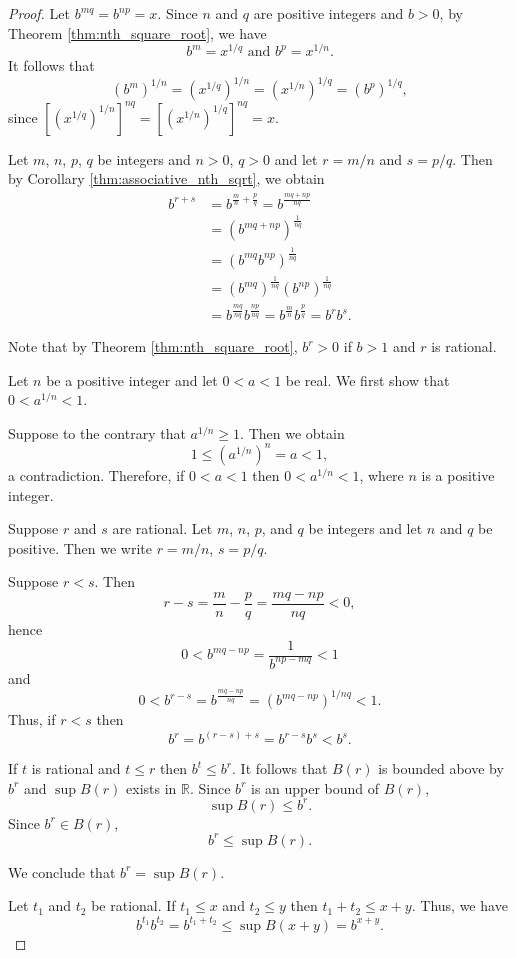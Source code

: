 \documentclass[11pt]{article}
\theoremstyle{definition}
\theoremstyle{plain}
\theoremstyle{remark}
\newcommand{\R}{\mathbb{R}}
\begin{document}
\begin{proof}
\item[(a)]
Let $b^{mq}=b^{np}=x$.
Since $n$ and $q$ are positive integers and $b>0$, by Theorem \ref{thm:nth_square_root}, we have 
\[
b^m=x^{1/q} \text{ and } b^p=x^{1/n}.
\]
It follows that
\[
(b^m)^{1/n}=(x^{1/q})^{1/n}=(x^{1/n})^{1/q}=(b^p)^{1/q},
\]
since $[(x^{1/q})^{1/n}]^{nq}=[(x^{1/n})^{1/q}]^{nq}=x$.
\item[(b)]Let $m$, $n$, $p$, $q$ be integers and $n>0$, $q>0$ and let $r=m/n$ and $s=p/q$. 
Then by Corollary \ref{thm:associative_nth_sqrt}, we obtain
\begin{align*}
b^{r+s}
&=b^{\frac{m}{n}+\frac{p}{q}}
=b^{\frac{mq+np}{nq}}\\
&=\left(b^{mq+np}\right)^{\frac{1}{nq}}\\
&=\left(b^{mq}b^{np}\right)^{\frac{1}{nq}}\\
&=\left(b^{mq}\right)^{\frac{1}{nq}} \left(b^{np}\right)^{\frac{1}{nq}}\\
&=b^{\frac{mq}{nq}} b^{\frac{np}{nq}}
=b^{\frac{m}{n}} b^{\frac{p}{q}}
=b^rb^s.
\end{align*}
\item[(c)]
Note that by Theorem \ref{thm:nth_square_root}, $b^r>0$ if $b>1$ and $r$ is rational.

Let $n$ be a positive integer and let $0<a<1$ be real. We first show that $0<a^{1/n}<1$.

Suppose to the contrary that $a^{1/n} \geq 1$. Then we obtain 
\[
1 \leq \left(a^{1/n}\right)^n=a<1,
\]
a contradiction. Therefore, if $0<a<1$ then $0<a^{1/n}<1$, where $n$ is a positive integer.

Suppose $r$ and $s$ are rational. 
Let $m$, $n$, $p$, and $q$ be integers and let $n$ and $q$ be positive.
Then we write $r=m/n$, $s=p/q$.

Suppose $r<s$. Then
\[
r-s =\frac{m}{n}-\frac{p}{q} =\frac{mq-np}{nq} <0,
\]
hence
\[
0 < b^{mq-np} = \frac{1}{b^{np-mq}} < 1
\]
and 
\[
0 < b^{r-s} = b^{\frac{mq-np}{nq}} = \left(b^{mq-np}\right)^{1/nq} < 1.
\]
Thus, if $r<s$ then
\[
b^r = b^{(r-s)+s} = b^{r-s}b^s < b^s.
\]

If $t$ is rational and $t \leq r$ then $b^t \leq b^r$. 
It follows that $B(r)$ is bounded above by $b^r$ and $\sup B(r)$ exists in $\R$.
Since $b^r$ is an upper bound of $B(r)$, 
\[
\sup B(r) \leq b^r.
\]
Since $b^r \in B(r)$,
\[
b^r \leq \sup B(r).
\]

We conclude that $b^r = \sup B(r)$.

\item[(d)]
Let $t_1$ and $t_2$ be rational. 
If $t_1 \leq x$ and $t_2 \leq y$ then $t_1+t_2 \leq x+y$.
Thus, we have
\[
b^{t_1}b^{t_2} = b^{t_1+t_2} \leq \sup B(x+y) =b^{x+y}.
\]


\end{proof}
\end{document}
